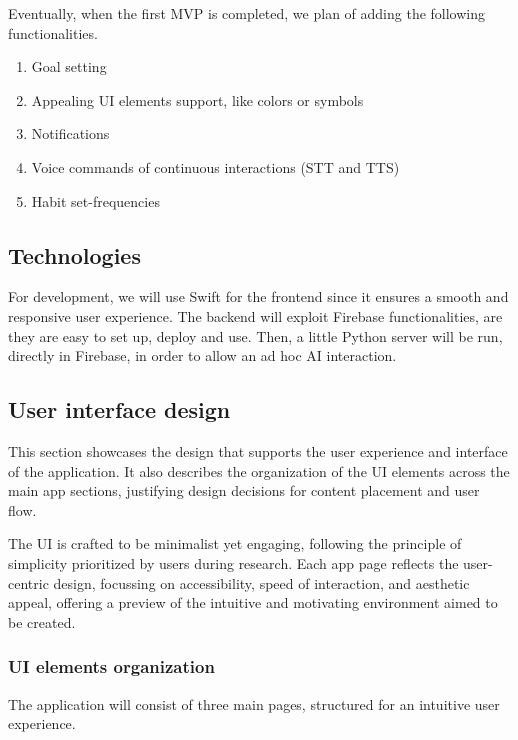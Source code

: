 \documentclass{article}
\begin{document}
Eventually, when the first MVP is completed, we plan of adding the following functionalities.

\begin{enumerate}
	\item Goal setting
	\item Appealing UI elements support, like colors or symbols
	\item Notifications
	\item Voice commands of continuous interactions (STT and TTS)
	\item Habit set-frequencies
\end{enumerate}

\subsection{Technologies}

For development, we will use Swift for the frontend since it ensures a smooth and responsive user experience.
The backend will exploit Firebase functionalities, are they are easy to set up, deploy and use.
Then, a little Python server will be run, directly in Firebase, in order to allow an ad hoc AI interaction.

\subsection{User interface design}

This section showcases the design that supports the user experience and interface of the application.
It also describes the organization of the UI elements across the main app sections, justifying design decisions for content placement and user flow.

The UI is crafted to be minimalist yet engaging, following the principle of simplicity prioritized by users during research.
Each app page reflects the user-centric design, focussing on accessibility, speed of interaction, and aesthetic appeal, offering a preview of the intuitive and motivating environment aimed to be created.

\subsubsection{UI elements organization}

The application will consist of three main pages, structured for an intuitive user experience.
\end{document}
